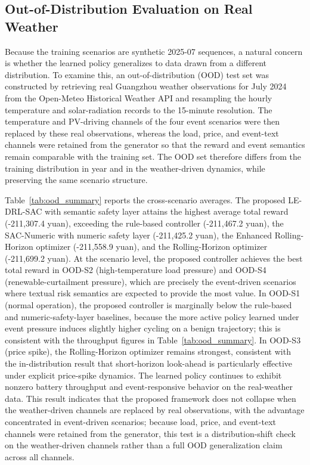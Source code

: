 \documentclass{ieeeaccess}
\begin{document}
\subsection{Out-of-Distribution Evaluation on Real Weather}
\label{sec:ood}
Because the training scenarios are synthetic 2025-07 sequences, a natural concern is whether the learned policy generalizes to data drawn from a different distribution. To examine this, an out-of-distribution (OOD) test set was constructed by retrieving real Guangzhou weather observations for July 2024 from the Open-Meteo Historical Weather API and resampling the hourly temperature and solar-radiation records to the 15-minute resolution. The temperature and PV-driving channels of the four event scenarios were then replaced by these real observations, whereas the load, price, and event-text channels were retained from the generator so that the reward and event semantics remain comparable with the training set. The OOD set therefore differs from the training distribution in year and in the weather-driven dynamics, while preserving the same scenario structure.

Table~\ref{tab:ood_summary} reports the cross-scenario averages. The proposed LE-DRL-SAC with semantic safety layer attains the highest average total reward (-211,307.4 yuan), exceeding the rule-based controller (-211,467.2 yuan), the SAC-Numeric with numeric safety layer (-211,425.2 yuan), the Enhanced Rolling-Horizon optimizer (-211,558.9 yuan), and the Rolling-Horizon optimizer (-211,699.2 yuan). At the scenario level, the proposed controller achieves the best total reward in OOD-S2 (high-temperature load pressure) and OOD-S4 (renewable-curtailment pressure), which are precisely the event-driven scenarios where textual risk semantics are expected to provide the most value. In OOD-S1 (normal operation), the proposed controller is marginally below the rule-based and numeric-safety-layer baselines, because the more active policy learned under event pressure induces slightly higher cycling on a benign trajectory; this is consistent with the throughput figures in Table~\ref{tab:ood_summary}. In OOD-S3 (price spike), the Rolling-Horizon optimizer remains strongest, consistent with the in-distribution result that short-horizon look-ahead is particularly effective under explicit price-spike dynamics. The learned policy continues to exhibit nonzero battery throughput and event-responsive behavior on the real-weather data. This result indicates that the proposed framework does not collapse when the weather-driven channels are replaced by real observations, with the advantage concentrated in event-driven scenarios; because load, price, and event-text channels were retained from the generator, this test is a distribution-shift check on the weather-driven channels rather than a full OOD generalization claim across all channels.
\end{document}
